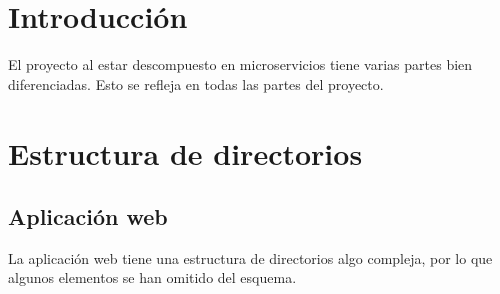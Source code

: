 
\section{Introducción}

El proyecto al estar descompuesto en microservicios tiene varias partes bien diferenciadas. Esto se refleja en todas las partes del proyecto. 

\section{Estructura de directorios}


\subsection{Aplicación web}
La aplicación web tiene una estructura de directorios algo compleja, por lo que algunos elementos se han omitido del esquema.

